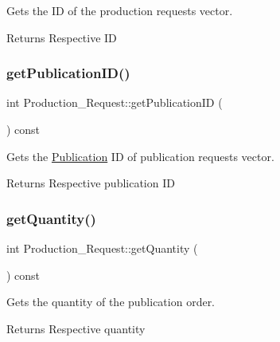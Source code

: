 Gets the ID of the production requests vector. 

\begin{DoxyReturn}{Returns}
Respective ID 
\end{DoxyReturn}
\mbox{\label{class_production___request_aafa7c4bbaae9dc72c8954a6e1eaff817}} 
\subsubsection{\texorpdfstring{get\+Publication\+I\+D()}{getPublicationID()}}
{\footnotesize\ttfamily int Production\+\_\+\+Request\+::get\+Publication\+ID (\begin{DoxyParamCaption}{ }\end{DoxyParamCaption}) const}



Gets the \hyperlink{class_publication}{Publication} ID of publication requests vector. 

\begin{DoxyReturn}{Returns}
Respective publication ID 
\end{DoxyReturn}
\mbox{\label{class_production___request_aac38238db2c32af73c839314c3e254a6}} 
\subsubsection{\texorpdfstring{get\+Quantity()}{getQuantity()}}
{\footnotesize\ttfamily int Production\+\_\+\+Request\+::get\+Quantity (\begin{DoxyParamCaption}{ }\end{DoxyParamCaption}) const}



Gets the quantity of the publication order. 

\begin{DoxyReturn}{Returns}
Respective quantity 
\end{DoxyReturn}
\mbox{\label{class_production___request_aed0efd10e677d4bca14d00b5f981718a}} 
